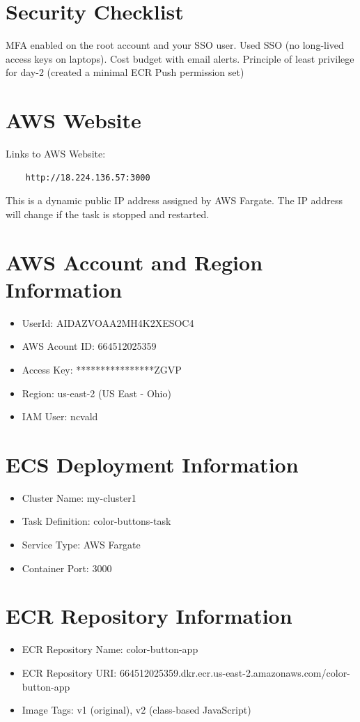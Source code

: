 \section{Security Checklist}
MFA enabled on the root account and your SSO user. Used SSO (no long-lived access keys on laptops). Cost budget with email alerts. Principle of least privilege for day-2 (created a minimal ECR Push permission set)

\section{AWS Website}
Links to AWS Website: 
\begin{verbatim}
    http://18.224.136.57:3000
\end{verbatim}
This is a dynamic public IP address assigned by AWS Fargate. The IP address will change if the task is stopped and restarted.

\section{AWS Account and Region Information}
\begin{itemize}
    \item UserId: AIDAZVOAA2MH4K2XESOC4
    \item AWS Acount ID: 664512025359
    \item Access Key: ****************ZGVP
    \item Region: us-east-2 (US East - Ohio)
    \item IAM User: ncvald
\end{itemize}

\section{ECS Deployment Information}

\begin{itemize}
    \item Cluster Name: my-cluster1
    \item Task Definition: color-buttons-task
    \item Service Type: AWS Fargate
    \item Container Port: 3000
\end{itemize}
\section{ECR Repository Information}
\begin{itemize}
    \item ECR Repository Name: color-button-app
    \item ECR Repository URI: 664512025359.dkr.ecr.us-east-2.amazonaws.com/color-button-app
    \item Image Tags: v1 (original), v2 (class-based JavaScript)
\end{itemize}

